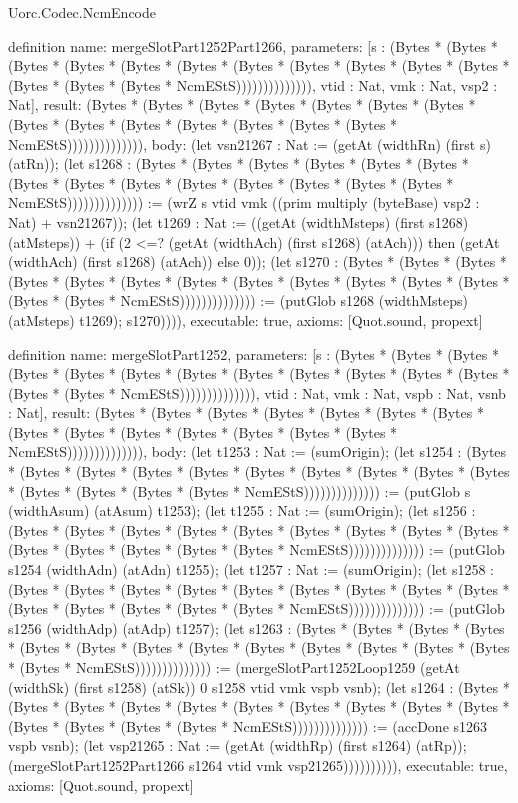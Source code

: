 \begin{lexlean}{Uorc.Codec.NcmEncode}
\begin{semanticmodule}
definition{
  name: mergeSlotPart1252Part1266,
  parameters: [s : (Bytes * (Bytes * (Bytes * (Bytes * (Bytes * (Bytes * (Bytes * (Bytes * (Bytes * (Bytes * (Bytes * (Bytes * (Bytes * (Bytes * NcmEStS)))))))))))))), vtid : Nat, vmk : Nat, vsp2 : Nat],
  result: (Bytes * (Bytes * (Bytes * (Bytes * (Bytes * (Bytes * (Bytes * (Bytes * (Bytes * (Bytes * (Bytes * (Bytes * (Bytes * (Bytes * NcmEStS)))))))))))))),
  body: (let vsn21267 : Nat := (getAt (widthRn) (first s) (atRn)); (let s1268 : (Bytes * (Bytes * (Bytes * (Bytes * (Bytes * (Bytes * (Bytes * (Bytes * (Bytes * (Bytes * (Bytes * (Bytes * (Bytes * (Bytes * NcmEStS)))))))))))))) := (wrZ s vtid vmk ((prim multiply (byteBase) vsp2 : Nat) + vsn21267)); (let t1269 : Nat := ((getAt (widthMsteps) (first s1268) (atMsteps)) + (if (2 <=? (getAt (widthAch) (first s1268) (atAch))) then (getAt (widthAch) (first s1268) (atAch)) else 0)); (let s1270 : (Bytes * (Bytes * (Bytes * (Bytes * (Bytes * (Bytes * (Bytes * (Bytes * (Bytes * (Bytes * (Bytes * (Bytes * (Bytes * (Bytes * NcmEStS)))))))))))))) := (putGlob s1268 (widthMsteps) (atMsteps) t1269); s1270)))),
  executable: true,
  axioms: [Quot.sound, propext]
}

definition{
  name: mergeSlotPart1252,
  parameters: [s : (Bytes * (Bytes * (Bytes * (Bytes * (Bytes * (Bytes * (Bytes * (Bytes * (Bytes * (Bytes * (Bytes * (Bytes * (Bytes * (Bytes * NcmEStS)))))))))))))), vtid : Nat, vmk : Nat, vspb : Nat, vsnb : Nat],
  result: (Bytes * (Bytes * (Bytes * (Bytes * (Bytes * (Bytes * (Bytes * (Bytes * (Bytes * (Bytes * (Bytes * (Bytes * (Bytes * (Bytes * NcmEStS)))))))))))))),
  body: (let t1253 : Nat := (sumOrigin); (let s1254 : (Bytes * (Bytes * (Bytes * (Bytes * (Bytes * (Bytes * (Bytes * (Bytes * (Bytes * (Bytes * (Bytes * (Bytes * (Bytes * (Bytes * NcmEStS)))))))))))))) := (putGlob s (widthAsum) (atAsum) t1253); (let t1255 : Nat := (sumOrigin); (let s1256 : (Bytes * (Bytes * (Bytes * (Bytes * (Bytes * (Bytes * (Bytes * (Bytes * (Bytes * (Bytes * (Bytes * (Bytes * (Bytes * (Bytes * NcmEStS)))))))))))))) := (putGlob s1254 (widthAdn) (atAdn) t1255); (let t1257 : Nat := (sumOrigin); (let s1258 : (Bytes * (Bytes * (Bytes * (Bytes * (Bytes * (Bytes * (Bytes * (Bytes * (Bytes * (Bytes * (Bytes * (Bytes * (Bytes * (Bytes * NcmEStS)))))))))))))) := (putGlob s1256 (widthAdp) (atAdp) t1257); (let s1263 : (Bytes * (Bytes * (Bytes * (Bytes * (Bytes * (Bytes * (Bytes * (Bytes * (Bytes * (Bytes * (Bytes * (Bytes * (Bytes * (Bytes * NcmEStS)))))))))))))) := (mergeSlotPart1252Loop1259 (getAt (widthSk) (first s1258) (atSk)) 0 s1258 vtid vmk vspb vsnb); (let s1264 : (Bytes * (Bytes * (Bytes * (Bytes * (Bytes * (Bytes * (Bytes * (Bytes * (Bytes * (Bytes * (Bytes * (Bytes * (Bytes * (Bytes * NcmEStS)))))))))))))) := (accDone s1263 vspb vsnb); (let vsp21265 : Nat := (getAt (widthRp) (first s1264) (atRp)); (mergeSlotPart1252Part1266 s1264 vtid vmk vsp21265)))))))))),
  executable: true,
  axioms: [Quot.sound, propext]
}


\end{semanticmodule}
\end{lexlean}
